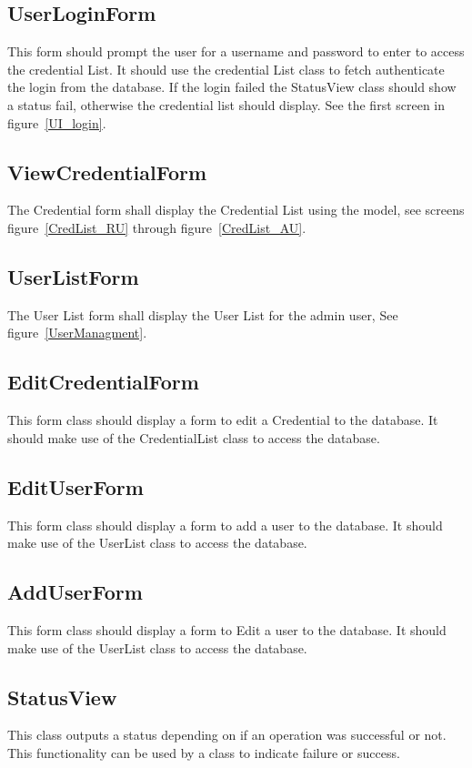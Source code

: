 \documentclass[letterpaper,12pt,oneside,listof=totoc]{scrreprt}
\begin{document}
\subsection{UserLoginForm}
This form should prompt the user for a username and password to enter to access the credential List. It should use the credential List class to fetch authenticate the login from the database. If the login failed the StatusView class should show a status fail, otherwise the credential list should display. See the first screen in figure~\ref{UI_login}. 

\subsection{ViewCredentialForm}
The Credential form shall display the Credential List using the model, see screens figure~\ref{CredList_RU} through figure~\ref{CredList_AU}.

\subsection{UserListForm}
The User List form shall display the User List for the admin user, See figure~\ref{UserManagment}. 

\subsection{EditCredentialForm}
This form class should display a form to edit a Credential to the database. It should make use of the CredentialList class to access the database.

\subsection{EditUserForm}
This form class should display a form to add a user to the database. It should make use of the UserList class to access the database.

\subsection{AddUserForm}
This form class should display a form to Edit a user to the database. It should make use of the UserList class to access the database.

\subsection{StatusView}
This class outputs a status depending on if an operation was successful or not. This functionality can be used by a class to indicate failure or success.
\end{document}
